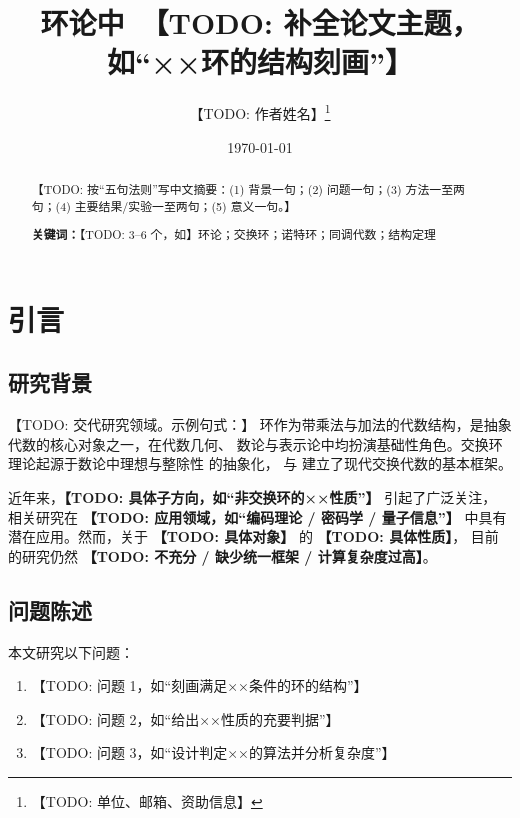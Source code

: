 \documentclass[11pt]{ctexart}
\theoremstyle{plain}
\theoremstyle{definition}
\theoremstyle{remark}
\begin{document}
\title{环论中\ 【TODO: 补全论文主题，如“××环的结构刻画”】}
\author{【TODO: 作者姓名】\thanks{【TODO: 单位、邮箱、资助信息】}}
\date{\today}
\maketitle

\begin{abstract}
【TODO: 按“五句法则”写中文摘要：(1) 背景一句；(2) 问题一句；(3)
方法一至两句；(4) 主要结果/实验一至两句；(5) 意义一句。】

\noindent\textbf{关键词：}【TODO: 3--6 个，如】环论；交换环；诺特环；同调代数；结构定理
\end{abstract}

\section{引言}
\label{sec:intro}

\subsection{研究背景}
\label{sec:background}
【TODO: 交代研究领域。示例句式：】
环作为带乘法与加法的代数结构，是抽象代数的核心对象之一，在代数几何、
数论与表示论中均扮演基础性角色。交换环理论起源于数论中理想与整除性
的抽象化，\cite{placeholder-atiyah} 与 \cite{placeholder-eisenbud}
建立了现代交换代数的基本框架。

近年来，\textbf{【TODO: 具体子方向，如“非交换环的××性质”】} 引起了广泛关注，
相关研究在 \textbf{【TODO: 应用领域，如“编码理论 / 密码学 / 量子信息”】}
中具有潜在应用。然而，关于 \textbf{【TODO: 具体对象】} 的 \textbf{【TODO: 具体性质】}，
目前的研究仍然 \textbf{【TODO: 不充分 / 缺少统一框架 / 计算复杂度过高】}。

\subsection{问题陈述}
\label{sec:problem}
本文研究以下问题：

\begin{enumerate}[label=(\arabic*)]
  \item 【TODO: 问题 1，如“刻画满足××条件的环的结构”】
  \item 【TODO: 问题 2，如“给出××性质的充要判据”】
  \item 【TODO: 问题 3，如“设计判定××的算法并分析复杂度”】
\end{enumerate}
\end{document}
